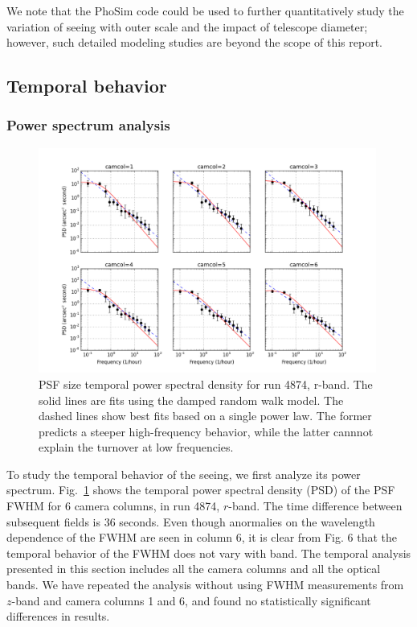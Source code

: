 We note that the PhoSim code could be used to further quantitatively study the variation
of seeing with outer scale and the impact of telescope diameter; however,
such detailed modeling studies are beyond the scope of this report. 


\subsection{Temporal behavior}

\subsubsection{Power spectrum analysis} 

\begin{figure}[th]
\centering
\includegraphics[width=0.99\textwidth]{FIGURES/temporalPSD.png}
\vskip -0.2in
\caption{PSF size temporal power spectral density for run 4874, r-band. 
The solid lines are fits using the damped random walk model. 
The dashed lines show best fits based on a single power law. The former
predicts a steeper high-frequency behavior, while the latter cannnot 
explain the turnover at low frequencies. 
\label{fig:psd}}
\end{figure}

To study the temporal behavior of the seeing, we first analyze its power spectrum.
Fig.~\ref{fig:psd} shows the temporal power spectral density (PSD) of the
PSF FWHM for 6 camera columns, in run 4874, $r$-band.
The time difference between subsequent fields is 36 seconds. 
Even though anormalies on the wavelength dependence of the FWHM are
seen in column 6, it is clear from Fig. 6 that the temporal behavior
of the FWHM does not vary with band. The temporal analysis presented
in this section includes all the camera columns and all the optical
bands. We have repeated the analysis without using FWHM measurements
from $z$-band and camera columns 1 and 6, and found no statistically significant
differences in results.

